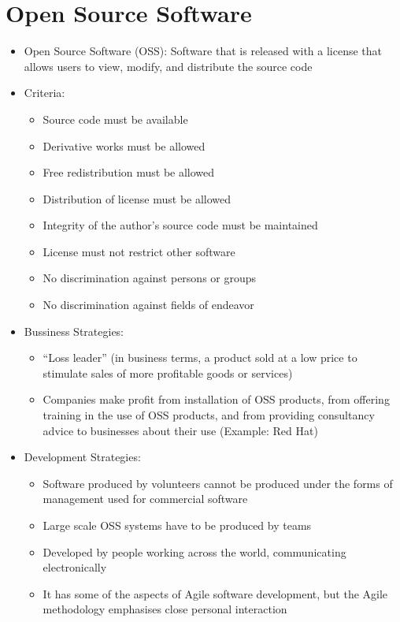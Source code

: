 \documentclass[12pt,openany]{book}
\begin{document}
\section{Open Source Software}
\begin{itemize}
    \item Open Source Software (OSS): Software that is released with a license that allows users to view, modify, and distribute the source code
    \item Criteria:
    \begin{itemize}
        \item Source code must be available
        \item Derivative works must be allowed
        \item Free redistribution must be allowed
        \item Distribution of license must be allowed
        \item Integrity of the author's source code must be maintained
        \item License must not restrict other software
        \item No discrimination against persons or groups
        \item No discrimination against fields of endeavor
    \end{itemize}
    \item Bussiness Strategies:
    \begin{itemize}
        \item ``Loss leader'' (in business terms, a product sold at a low price to stimulate sales of more profitable goods or services)
        \item Companies make profit from installation of OSS products, from offering training in the use of OSS products, and from providing consultancy advice to businesses about their use (Example: Red Hat)
    \end{itemize}
    \item Development Strategies:
    \begin{itemize}
        \item Software produced by volunteers cannot be produced under the forms of management used for commercial software
        \item Large scale OSS systems have to be produced by teams
        \item Developed by people working across the world, communicating electronically
        \item It has some of the aspects of Agile software development, but the Agile methodology emphasises close personal interaction

\end{itemize}
\end{itemize}
\end{document}
